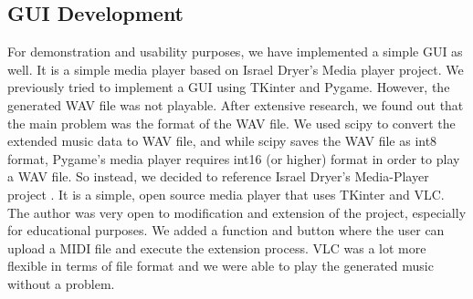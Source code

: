 \documentclass{article}
\begin{document}
\subsection{GUI Development}
For demonstration and usability purposes, we have implemented a simple GUI as well. It is a simple media player based on Israel Dryer's Media player project. We previously tried 
to implement a GUI using TKinter and Pygame. However, the generated WAV file was not playable. After extensive research, we found out that the main problem was the format 
of the WAV file. We used scipy to convert the extended music data to WAV file, and while scipy saves the WAV file as int8 format,
Pygame's media player requires int16 (or higher) format in order to play a WAV file. So instead, we decided to reference Israel Dryer's Media-Player project \cite{media_player}.
It is a simple, open source media player that uses TKinter and VLC. The author was very open to modification and extension of the project, especially for educational purposes.
We added a function and button where the user can upload a MIDI file and execute the extension process. VLC was a lot more flexible in terms of file format and we were able 
to play the generated music without a problem.

\end{document}
